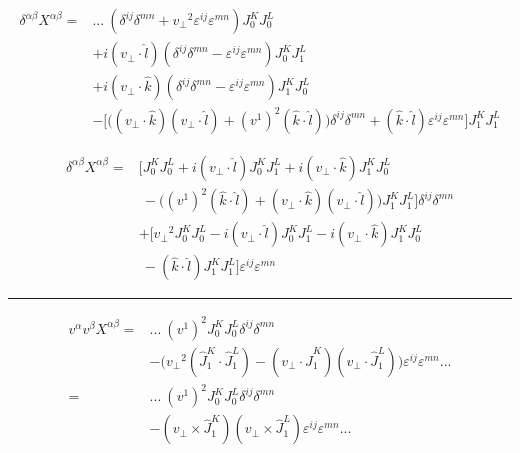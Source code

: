 \begin{equation*}
\begin{split}
\delta^{\alpha \beta} X^{\alpha \beta}=& ...~ (\delta^{ij} \delta^{mn} + {v_\perp}^2 \varepsilon^{ij} \varepsilon^{mn}) J_0 ^K J_0^L \\
& + i (v_\perp \cdot \hat{l}) (\delta^{ij} \delta^{mn} - \varepsilon^{ij} \varepsilon^{mn}) J_0 ^K J_1^L \\
& + i (v_\perp \cdot \hat{k}) (\delta^{ij} \delta^{mn} - \varepsilon^{ij} \varepsilon^{mn}) J_1 ^K J_0^L \\
& - \bigg[ \Big((v_\perp \cdot \hat{k}) (v_\perp \cdot \hat{l}) + (v^1)^2 (\hat{k} \cdot \hat{l}) \Big) \delta^{ij} \delta^{mn} + (\hat{k} \cdot \hat{l}) \varepsilon^{ij}\varepsilon^{mn} \bigg] J_1 ^K J_1^L \end{split}
\end{equation*}

\begin{equation*}
\begin{split}
\delta^{\alpha \beta} X^{\alpha \beta} = & \Big[ J_0^K J_0^L + i(v_\perp \cdot \hat{l}) J_0^K J_1^L + i(v_\perp \cdot \hat{k}) J_1^K J_0^L\\
& ~ -\Big((v^1)^2 (\hat{k} \cdot \hat{l})+(v_\perp \cdot \hat{k}) (v_\perp \cdot \hat{l}) \Big)J_1^K J_1^L \Big] \delta^{ij} \delta^{mn}\\
& + \Big[ {v_\perp}^2 J_0^KJ_0^L - i (v_\perp \cdot \hat{l}) J_0^K J_1^L - i (v_\perp \cdot \hat{k}) J_1^K J_0^L\\
& ~ - (\hat{k} \cdot \hat{l}) J_1^K J_1^L \Big] \varepsilon^{ij} \varepsilon^{mn}
\end{split}
\end{equation*}

\hrule

\begin{equation*}
\begin{split}
v^\alpha v^\beta X^{\alpha \beta} = & ...~ (v^1)^2 J_0 ^K J_0^L \delta^{ij} \delta^{mn} \\
& - \Big( {v_\perp}^2 (\hat{J}_1^K \cdot \hat{J}_1^L) - (v_\perp \cdot \hat{J}_1^K)(v_\perp \cdot \hat{J}_1^L)\Big)  \varepsilon^{ij} \varepsilon^{mn} ... \\
= & ...~ (v^1)^2 J_0 ^K J_0^L \delta^{ij} \delta^{mn} \\
& - (v_\perp \times \hat{J}_1^K)(v_\perp \times \hat{J}_1^L)  \varepsilon^{ij} \varepsilon^{mn} ...
\end{split}
\end{equation*}

